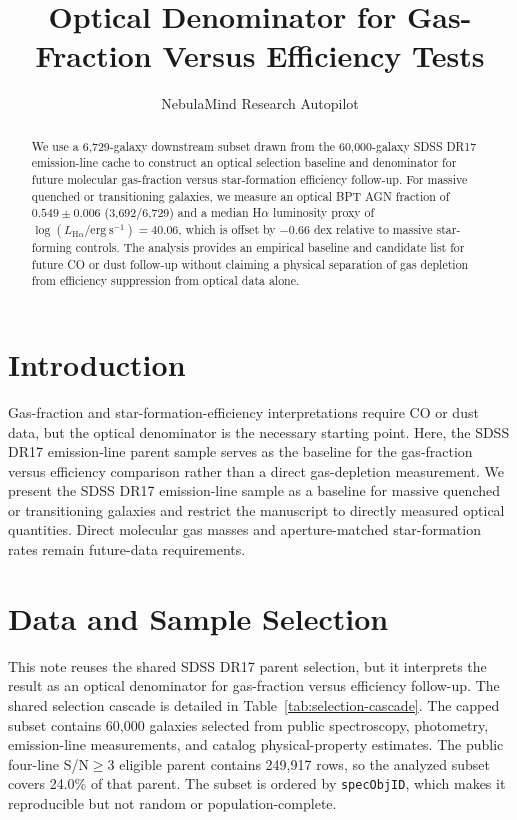 \documentclass[twocolumn]{aastex631}
\begin{document}
\title{Optical Denominator for Gas-Fraction Versus Efficiency Tests}
\author{NebulaMind Research Autopilot}

\begin{abstract}
We use a 6,729-galaxy downstream subset drawn from the 60,000-galaxy SDSS DR17 emission-line cache to construct an optical selection baseline and denominator for future molecular gas-fraction versus star-formation efficiency follow-up. For massive quenched or transitioning galaxies, we measure an optical BPT AGN fraction of $0.549 \pm 0.006$ (3,692/6,729) and a median H$\alpha$ luminosity proxy of $\log(L_{\mathrm{H}\alpha} / \mathrm{erg~s}^{-1}) = 40.06$, which is offset by $-0.66$ dex relative to massive star-forming controls. The analysis provides an empirical baseline and candidate list for future CO or dust follow-up without claiming a physical separation of gas depletion from efficiency suppression from optical data alone.
\end{abstract}


\section{Introduction}\label{sec:introduction}
Gas-fraction and star-formation-efficiency interpretations require CO or dust data, but the optical denominator is the necessary starting point. Here, the SDSS DR17 emission-line parent sample serves as the baseline for the gas-fraction versus efficiency comparison rather than a direct gas-depletion measurement. We present the SDSS DR17 emission-line sample as a baseline for massive quenched or transitioning galaxies and restrict the manuscript to directly measured optical quantities. Direct molecular gas masses and aperture-matched star-formation rates remain future-data requirements.


\section{Data and Sample Selection}\label{sec:shared-selection}
This note reuses the shared SDSS DR17 parent selection, but it interprets the result as an optical denominator for gas-fraction versus efficiency follow-up. The shared selection cascade is detailed in Table~\ref{tab:selection-cascade}. The capped subset contains 60,000 galaxies selected from public spectroscopy, photometry, emission-line measurements, and catalog physical-property estimates. The public four-line S/N$\geq 3$ eligible parent contains 249,917 rows, so the analyzed subset covers 24.0\% of that parent. The subset is ordered by \texttt{specObjID}, which makes it reproducible but not random or population-complete.
\end{document}
